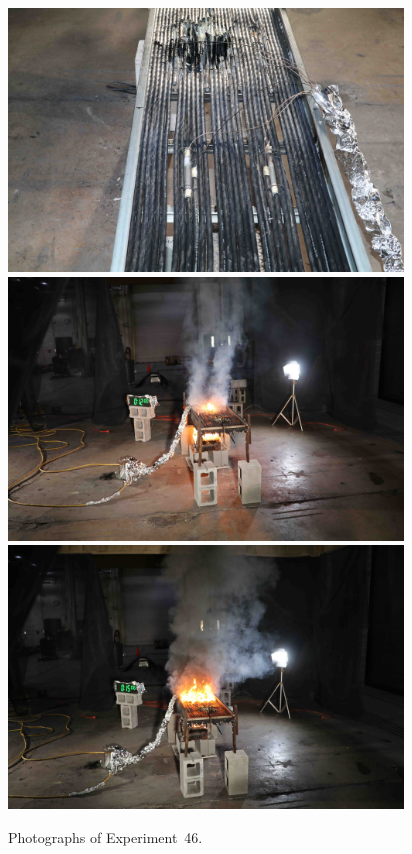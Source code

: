 \begin{figure}[p]
\centering
\includegraphics[height=2.75in]{../FIGURES/Test_46_setup} \\
\includegraphics[height=2.75in]{../FIGURES/Test_46_ignition} \\
\includegraphics[height=2.75in]{../FIGURES/Test_46_burning}
\caption[Photographs of Experiment~46]{Photographs of Experiment~46.}
\label{fig:Test_46_photos}
\end{figure}


\clearpage

